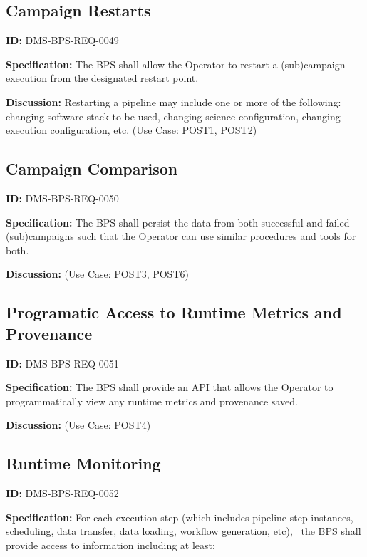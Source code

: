 \documentclass[SE,toc,lsstdraft]{lsstdoc}
\begin{document}
\subsection{Campaign Restarts}

\label{DMS-BPS-REQ-0049}
\textbf{ID:} DMS-BPS-REQ-0049

\textbf{Specification:}
The BPS shall allow the Operator to restart a (sub)campaign execution from the designated restart point.

\textbf{Discussion:}
Restarting a pipeline may include one or more of the following: changing software stack to be used, changing science configuration, changing execution configuration, etc.  (Use Case: POST1, POST2)

\subsection{Campaign Comparison}

\label{DMS-BPS-REQ-0050}
\textbf{ID:} DMS-BPS-REQ-0050

\textbf{Specification:}
The BPS shall persist the data from both successful and failed (sub)campaigns such that the Operator can use similar procedures and tools for both.

\textbf{Discussion:}
(Use Case: POST3, POST6)

\subsection{Programatic Access to Runtime Metrics and Provenance}

\label{DMS-BPS-REQ-0051}
\textbf{ID:} DMS-BPS-REQ-0051

\textbf{Specification:}
The BPS shall provide an API that allows the Operator to programmatically view any runtime metrics and provenance saved.

\textbf{Discussion:}
(Use Case: POST4)

\subsection{Runtime Monitoring}

\label{DMS-BPS-REQ-0052}
\textbf{ID:} DMS-BPS-REQ-0052

\textbf{Specification:}
For each execution step (which includes pipeline step instances, scheduling, data transfer, data loading, workflow generation, etc),  the BPS shall provide access to information including at least:
\\
\end{document}
